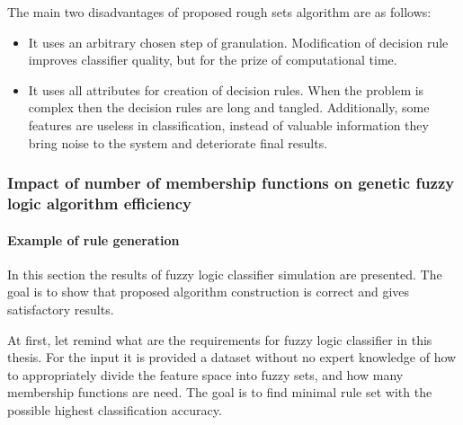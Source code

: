 The main two disadvantages of proposed rough sets algorithm are as follows:
\begin{itemize}
    \item It uses an arbitrary chosen step of granulation. Modification of
        decision rule improves classifier quality, but for the prize of
        computational time. 
    \item It uses all attributes for creation of decision rules. When the
        problem is complex then the decision rules are long and tangled. 
        Additionally, some features are useless in classification, instead of valuable
        information they bring noise to the system and deteriorate final results.
\end{itemize}

\subsubsection{Impact of number of membership functions on genetic fuzzy logic algorithm efficiency}
\label{cha:Simulation_reaearch_3}
\paragraph{Example of rule generation}
In this section the results of fuzzy logic classifier simulation are presented.
The goal is to show that proposed algorithm construction is correct and gives
satisfactory results. 

At first, let remind what are the requirements for fuzzy logic classifier in
this thesis. For the input it is provided a dataset without no expert knowledge 
of how to appropriately divide the feature space into fuzzy sets, and how many membership
functions are need. The goal is to find minimal rule set with the possible highest
classification accuracy. 

